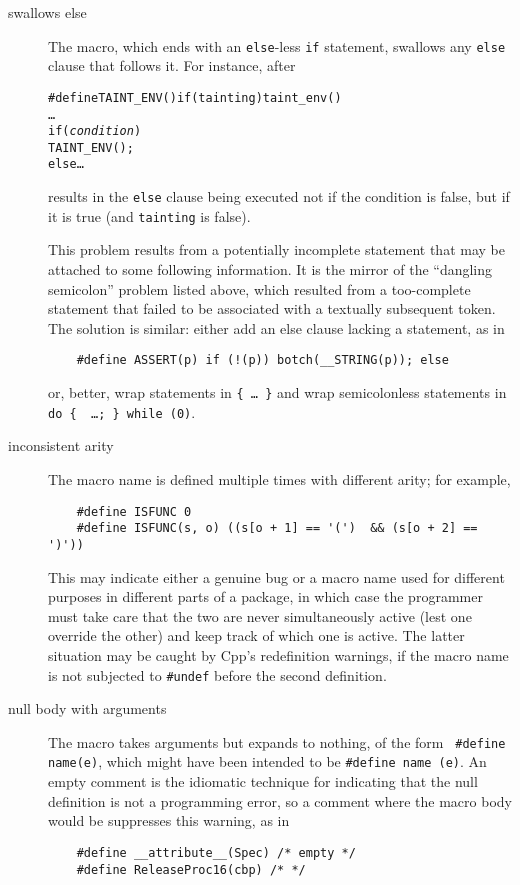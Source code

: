 \documentclass[10pt]{article}
\begin{document}
\begin{description}
\item[swallows else]
        The macro, which ends with an {\tt else}-less {\tt if} statement,
        swallows any {\tt else} clause that follows it.  For instance, after
\begin{alltt}
    #define TAINT_ENV() if (tainting) taint_env()
    \ldots
    if ({\rm\em{}condition})
      TAINT_ENV();
    else \ldots
\end{alltt}
        results in the {\tt else} clause being executed not if  the
        condition is false, but if it is true (and {\tt tainting} is false).
        
        This problem results from a potentially incomplete statement that
        may be attached to some following information.  It is the mirror of
        the ``dangling semicolon'' problem listed above, which
        resulted from a too-complete statement that failed to be
        associated with a textually subsequent token.  The solution is
        similar: either add an else clause lacking a statement, as in
\begin{verbatim}
    #define ASSERT(p) if (!(p)) botch(__STRING(p)); else
\end{verbatim}
        or, better, wrap statements in {\tt \verb|{| \ldots\ \verb|}|} and
        wrap semicolonless statements in {\tt do \verb|{| {\rm
        \ldots}\verb|; }| while (0)}.

\item[inconsistent arity]
        The macro name is defined multiple times with different arity; for example,
\begin{verbatim}
    #define ISFUNC 0
    #define ISFUNC(s, o) ((s[o + 1] == '(')  && (s[o + 2] == ')'))
\end{verbatim}
        This may indicate either a genuine bug or a macro name used for
        different purposes in different parts of a package, in which case
        the programmer must take care that the two are never simultaneously
        active (lest one override the other) and keep track of which one is
        active.  The latter situation may be
        caught by Cpp's redefinition warnings, if the macro name is not
        subjected to {\tt \#undef} before the second definition.

\item[null body with arguments]
        The macro takes arguments but expands to nothing, of the form {\tt
        \#define name(e)},
        which might have been intended to be {\tt \#define name (e)}.
        An empty comment is the idiomatic technique for indicating that the
        null definition is not a programming error, so a comment where the macro
        body would be suppresses this warning, as in
\begin{verbatim}
    #define __attribute__(Spec) /* empty */
    #define ReleaseProc16(cbp) /* */
\end{verbatim}


\end{description}
\end{document}
